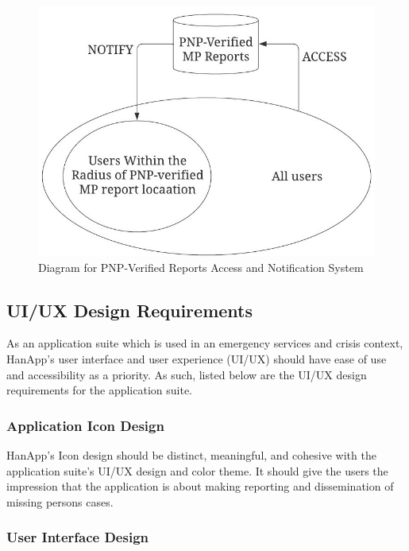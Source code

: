 \begin{figure}[!h]
    \centering
    \includegraphics[scale = 1.50]{figures/Chapter3/Chapt3_Diag_locationBasedNotif.jpeg}
    \caption{Diagram for PNP-Verified Reports Access and Notification System}
    \label{fig:diagramLocation}
\end{figure}

\subsection{UI/UX Design Requirements}

As an application suite which is used in an emergency services and crisis context, HanApp's user interface and user experience (UI/UX) should have ease of use and accessibility as a priority. As such, listed below are the UI/UX  design requirements for the application suite.

\subsubsection{Application Icon Design}

HanApp's Icon design should be distinct, meaningful, and cohesive with the application suite's UI/UX design and color theme. It should give the users the impression that the application is about making reporting and dissemination of missing persons cases.

\subsubsection{User Interface Design}

